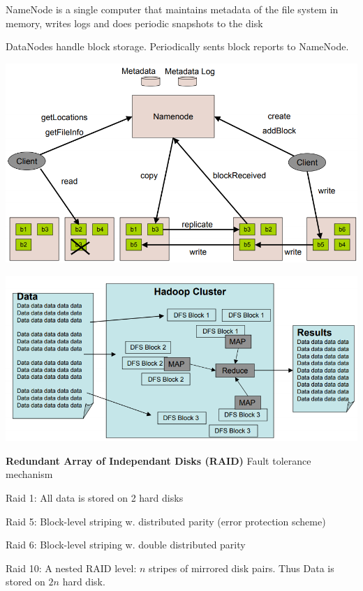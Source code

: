 \documentclass[a4paper,12pt]{article}
\begin{document}
\bigskip
NameNode is a single computer that maintains metadata of the file system in memory, writes
logs and does periodic snapshots to the disk

DataNodes handle block storage. Periodically sents block reports to NameNode.

\begin{minipage}{0.5\linewidth}
\includegraphics[width=\textwidth]{archi}
\end{minipage}
\hspace{1cm}
\begin{minipage}{0.5\linewidth}
  \includegraphics[width=\textwidth]{archi2}  
\end{minipage}

\bigskip
\textbf{Redundant Array of Independant Disks (RAID)} Fault tolerance mechanism

\bigskip
Raid 1: All data is stored on 2 hard disks

Raid 5: Block-level striping w. distributed parity (error protection scheme)

Raid 6: Block-level striping w. double distributed parity

Raid 10: A nested RAID level: $n$ stripes of mirrored disk pairs. Thus Data is stored on $2n$
hard disk.
\end{document}

